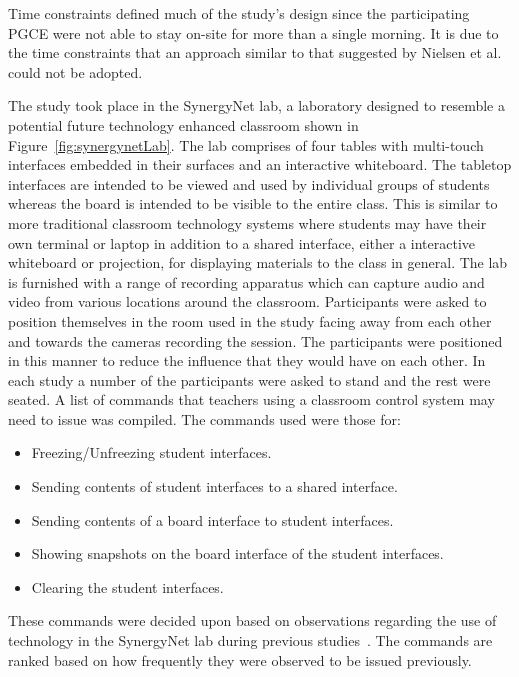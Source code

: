 \documentclass[manuscript, review, screen]{acmart}
\begin{document}
Time constraints defined much of the study's design since the participating \ac{PGCE} were not able to stay on-site for more than a single morning.
It is due to the time constraints that an approach similar to that suggested by Nielsen et al.~\citeyearpar{Nielsen2004} could not be adopted.

The study took place in the SynergyNet lab, a laboratory designed to resemble a potential future technology enhanced classroom shown in Figure~\ref{fig:synergynetLab}.
The lab comprises of four tables with multi-touch interfaces embedded in their surfaces and an interactive whiteboard. 
The tabletop interfaces are intended to be viewed and used by individual groups of students whereas the board is intended to be visible to the entire class.
This is similar to more traditional classroom technology systems where students may have their own terminal or laptop in addition to a shared interface, either a interactive whiteboard or projection, for displaying materials to the class in general.
The lab is furnished with a range of recording apparatus which can capture audio and video from various locations around the classroom.
Participants were asked to position themselves in the room used in the study facing away from each other and towards the cameras recording the session.
The participants were positioned in this manner to reduce the influence that they would have on each other.
In each study a number of the participants were asked to stand and the rest were seated.
A list of commands that teachers using a classroom control system may need to issue was compiled.
The commands used were those for: 
\begin{itemize}
\item Freezing/Unfreezing student interfaces.
\item Sending contents of student interfaces to a shared interface.
\item Sending contents of a board interface to student interfaces.
\item Showing snapshots on the board interface of the student interfaces.
\item Clearing the student interfaces.\\
\end{itemize}

These commands were decided upon based on observations regarding the use of technology in the SynergyNet lab during previous studies~\citep{Hatch2011}.
The commands are ranked based on how frequently they were observed to be issued previously.
\end{document}
